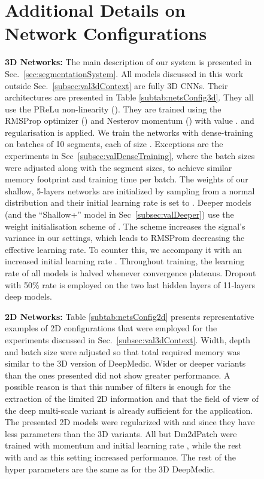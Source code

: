 \documentclass[preprint,authoryear,12pt]{elsarticle}
\newcommand{\quot}[1]{``#1''}
\begin{document}
\begin{figure}[h]
\section{Additional Details on Network Configurations}
\label{app:detailsConfig}

\textbf{3D Networks:} The main description of our system is presented in Sec.~\ref{sec:segmentationSystem}. All models discussed in this work outside Sec.~\ref{subsec:val3dContext} are fully 3D CNNs. Their architectures are presented in Table \ref{subtab:netsConfig3d}. They all use the PReLu non-linearity (\cite{he2015delving}). They are trained using the RMSProp optimizer (\cite{rmsProp}) and Nesterov momentum (\cite{sutskever2013importance}) with value .  and  regularisation is applied. We train the networks with dense-training on batches of 10 segments, each of size . Exceptions are the experiments in Sec~\ref{subsec:valDenseTraining}, where the batch sizes were adjusted along with the segment sizes, to achieve similar memory footprint and training time per batch. The weights of our shallow, 5-layers networks are initialized by sampling from a normal distribution  and their initial learning rate is set to . Deeper models (and the \quot{Shallow+} model in Sec~\ref{subsec:valDeeper}) use the weight initialisation scheme of \cite{he2015delving}. The scheme increases the signal's variance in our settings, which leads to RMSProm decreasing the effective learning rate. To counter this, we accompany it with an increased initial learning rate . Throughout training, the learning rate of all models is halved whenever convergence plateaus. Dropout with 50\% rate is employed on the two last hidden layers of 11-layers deep models.

\textbf{2D Networks:} Table \ref{subtab:netsConfig2d} presents representative examples of 2D configurations that were employed for the experiments discussed in Sec.~\ref{subsec:val3dContext}. Width, depth and batch size were adjusted so that total required memory was similar to the 3D version of DeepMedic. Wider or deeper variants than the ones presented did not show greater performance. A possible reason is that this number of filters is enough for the extraction of the limited 2D information and that the field of view of the deep multi-scale variant is already sufficient for the application. The presented 2D models were regularized with  and  since they have less parameters than the 3D variants. All but Dm2dPatch were trained with momentum  and initial learning rate , while the rest with  and  as this setting increased performance. The rest of the hyper parameters are the same as for the 3D DeepMedic.


\end{figure}
\end{document}
